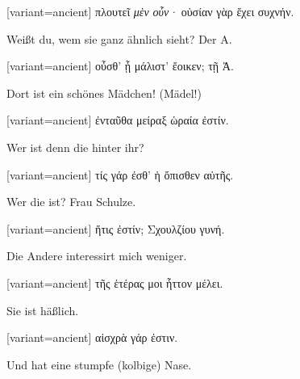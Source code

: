 \switchcolumn

\begin{greek}[variant=ancient]%
πλουτεῖ \emph{μὲν οὖν·} οὐσίαν γὰρ ἔχει συχνήν.

\end{greek}%
\switchcolumn*

Weißt du, wem sie ganz ähnlich sieht? Der A. 

\switchcolumn

\begin{greek}[variant=ancient]%
οὖσθ' ᾗ μάλιστ' ἔοικεν; τῇ Ἀ.

\end{greek}%
\switchcolumn*

Dort ist ein schönes Mädchen! (Mädel!) 

\switchcolumn

\begin{greek}[variant=ancient]%
ἐνταῦθα μείραξ ὡραία ἐστίν.

\end{greek}%
\switchcolumn*

Wer ist denn die hinter ihr? 

\switchcolumn

\begin{greek}[variant=ancient]%
τίς γάρ ἐσθ' ἡ ὄπισθεν αὐτῆς.

\end{greek}%
\switchcolumn*

Wer die ist? Frau Schulze. 

\switchcolumn

\begin{greek}[variant=ancient]%
ἥτις ἐστίν; Σχουλζίου γυνή.

\end{greek}%
\switchcolumn*

Die Andere interessirt mich weniger. 

\switchcolumn

\begin{greek}[variant=ancient]%
τῆς ἑτέρας μοι ἧττον μέλει.

\end{greek}%
\switchcolumn*

Sie ist häßlich. 

\switchcolumn

\begin{greek}[variant=ancient]%
αἰσχρὰ γάρ ἐστιν.

\end{greek}%
\switchcolumn*

Und hat eine stumpfe (kolbige) Nase. 

